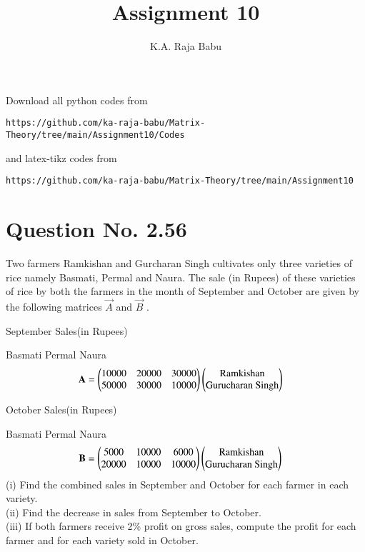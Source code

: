 \documentclass[journal,12pt,twocolumn]{IEEEtran}
\begin{document}
     \def\rightbox#1{\makebox[0in][r]{#1}}
     \def\centbox#1{\makebox[0in]{#1}}
     \def\topbox#1{\raisebox{-\baselineskip}[0in][0in]{#1}}
     \def\midbox#1{\raisebox{-0.5\baselineskip}[0in][0in]{#1}}
\vspace{3cm}
\title{Assignment 10}
\author{K.A. Raja Babu}
\maketitle
\newpage
\bigskip
\renewcommand{\thefigure}{\theenumi}
\renewcommand{\thetable}{\theenumi}
Download all python codes from 
\begin{lstlisting}
https://github.com/ka-raja-babu/Matrix-Theory/tree/main/Assignment10/Codes
\end{lstlisting}
%
and latex-tikz codes from 
%
\begin{lstlisting}
https://github.com/ka-raja-babu/Matrix-Theory/tree/main/Assignment10
\end{lstlisting}
%
\section{Question No. 2.56}
Two farmers Ramkishan and Gurcharan Singh cultivates only three varieties of rice namely Basmati, Permal and Naura. The sale (in Rupees) of these varieties of rice by both the farmers in the month of September and October are given by the following matrices $\vec{A}$ and $\vec{B}$ .

\begin{center}
September Sales(in Rupees)
\end{center}
\hspace{0.8cm} Basmati \hspace{0.02cm} Permal \hspace{0.01cm} Naura
\begin{align}
    \mathbf{A} &= \begin{pmatrix}10000 & 20000 & 30000 \\ 50000 & 30000 & 10000\end{pmatrix}\begin{pmatrix}\text{Ramkishan} \\ \text{Gurucharan Singh}\end{pmatrix}
\end{align}

\begin{center}
October Sales(in Rupees)
\end{center}
\hspace{0.8cm} Basmati \hspace{0.02cm} Permal \hspace{0.01cm} Naura
\begin{align}
    \mathbf{B} &= \begin{pmatrix}5000 & 10000 & 6000 \\ 20000 & 10000 & 10000\end{pmatrix}\begin{pmatrix}\text{Ramkishan} \\ \text{Gurucharan Singh}\end{pmatrix}
\end{align}
(i) Find the combined sales in September and October for each farmer in each variety.\\
(ii) Find the decrease in sales from September to October.\\
(iii) If both farmers receive 2\% profit on gross sales, compute the profit for each farmer and for each variety sold in October.
%
\end{document}
